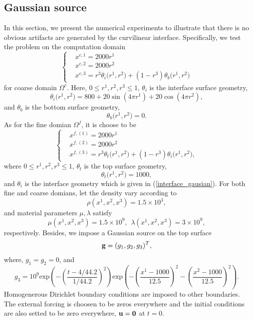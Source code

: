 \subsection{Gaussian source}\label{gaussian_source}
In this section, we present the numerical experiments to illustrate that there is no obvious artifacts are generated by the curvilinear interface. Specifically, we test the problem on the computation domain
\begin{equation}
\left\{
\begin{aligned}
& x^{c,1} = 2000 r^1\\
& x^{c,2} = 2000 r^2\\
& x^{c,3} = r^3 \theta_i\big(r^1,r^2\big) + (1-r^3) \theta_b\big(r^1,r^2\big)
\end{aligned}
\right.
\end{equation}
for coarse domain $\Omega^c$. Here, $0\leq r^1, r^2, r^3\leq 1$, $\theta_i$ is the interface surface geometry,
\begin{equation}\label{interface_gausian}
\theta_i\big(r^1,r^2\big) = 800+20\sin(4\pi r^1)+20\cos(4\pi r^2),
\end{equation}
and 
$\theta_b$ is the bottom surface geometry,
\begin{equation}
\theta_b\big(r^1,r^2\big) = 0.
\end{equation}
As for the fine domian $\Omega^f$, it is choose to be
\begin{equation}
\left\{
\begin{aligned}
& x^{f,(1)} = 2000 r^1\\
& x^{f,(2)} = 2000 r^2\\
& x^{f,(3)} = r^3\theta_t\big(r^1,r^2\big) + (1-r^3)\theta_i\big(r^1,r^2\big),
\end{aligned}
\right.
\end{equation}
where $0\leq r^1, r^2, r^3\leq 1$, $\theta_t$ is the top surface geometry,
\begin{equation}
\theta_t\big(r^1,r^2\big) = 1000,
\end{equation}
and $\theta_i$ is the interface geometry which is given in (\ref{interface_gausian}). For both fine and coarse domians, let the density vary according to
\begin{equation}
\rho(x^1,x^2,x^3) = 1.5\times 10^3,
\end{equation}
and material parameters $\mu, \lambda$ satisfy
\begin{equation}
\mu(x^1,x^2,x^3) = 1.5\times 10^9,\ \ 
\lambda(x^1,x^2,x^3)  = 3\times 10^9,
\end{equation}
respectively. Besides, we impose a Gaussian source on the top surface
\[{\bf g} = (g_1,g_2,g_3)^T ,\]
where, $g_1 = g_2 = 0$, and 
\[g_3 = 10^9 \text{exp}\left(-\left(\frac{t-4/44.2}{1/44.2}\right)^2\right)\text{exp}\left(-\left(\frac{x^1-1000}{12.5}\right)^2-\left(\frac{x^2-1000}{12.5}\right)^2\right).\]
Homogenerous Dirichlet boundary conditions are imposed to other boundaries. The external forcing is choosen to be zeros everywhere and the initial conditions are also setted to be zero everywhere, ${\bf u} = {\bf 0}$ at $t = 0$.

